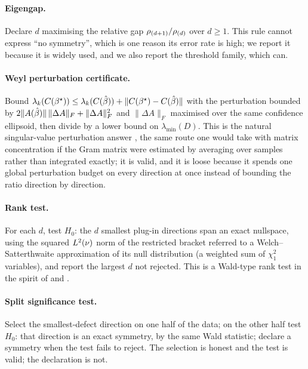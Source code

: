 \paragraph{Eigengap.} Declare $d$ maximising the relative gap
$\rho_{(d+1)}/\rho_{(d)}$ over $d \ge 1$. This rule cannot express ``no
symmetry'', which is one reason its error rate is high; we report it because it
is widely used, and we also report the threshold family, which can.

\paragraph{Weyl perturbation certificate.} Bound
$\lambda_k(C(\beta^\star)) \le \lambda_k(C(\hat{\beta})) + \|C(\beta^\star)-C(\hat{\beta})\|$
with the perturbation bounded by
$2\|A(\hat{\beta})\|\,\|\Delta A\|_F + \|\Delta A\|_F^2$ and $\|\Delta A\|_F$
maximised over the same confidence ellipsoid, then divide by a lower bound on
$\lambda_{\min}(D)$. This is the natural singular-value perturbation answer
\citep{bhatia1997matrix,davis1970rotation,yu2015useful}, the same route one would
take with matrix concentration \citep{tropp2012user} if the Gram matrix were
estimated by averaging over samples rather than integrated exactly; it is valid,
and it is
loose because it spends one global perturbation budget on every direction at
once instead of bounding the ratio direction by direction.

\paragraph{Rank test.} For each $d$, test $H_0$: the $d$ smallest plug-in
directions span an exact nullspace, using the squared $L^2(\nu)$ norm of the
restricted bracket referred to a Welch--Satterthwaite approximation of its null
distribution (a weighted sum of $\chi^2_1$ variables), and report the largest
$d$ not rejected. This is a Wald-type rank test in the spirit of
\citet{robin2000tests} and \citet{kleibergen2006generalized}.

\paragraph{Split significance test.} Select the smallest-defect direction on one
half of the data; on the other half test $H_0$: that direction is an exact
symmetry, by the same Wald statistic; declare a symmetry when the test fails to
reject. The selection is honest and the test is valid; the declaration is not.

